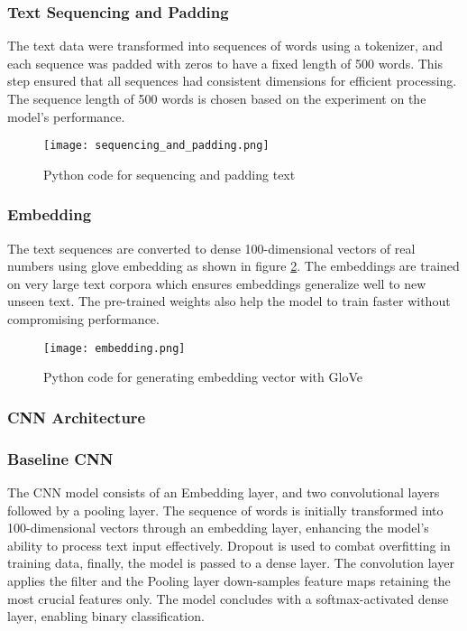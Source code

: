 \subsubsection{Text Sequencing and Padding} The text data were transformed into sequences of words using a tokenizer, and each sequence was padded with zeros to have a fixed length of 500 words. This step ensured that all sequences had consistent dimensions for efficient processing. The sequence length of 500 words is chosen based on the experiment on the model's performance.

\begin{figure}[h]
    \centering
    \texttt{[image: sequencing\_and\_padding.png]}
    \caption{Python code for sequencing and padding text}
    \label{fig:sequencing_and_padding}
\end{figure}

\subsubsection{Embedding} The text sequences are converted to dense 100-dimensional vectors of real numbers using \ac{glove} embedding as shown in figure \ref{fig:embedding_with_glove}. The embeddings are trained on very large text corpora which ensures embeddings generalize well to new unseen text. The pre-trained weights also help the model to train faster without compromising performance.

\begin{figure}[h]
    \centering
    \texttt{[image: embedding.png]}
    \caption{Python code for generating embedding vector with GloVe}
    \label{fig:embedding_with_glove}
\end{figure}

\clearpage
\subsubsection{CNN Architecture}
\subsubsection{Baseline CNN}
The CNN model consists of an Embedding layer, and two convolutional layers followed by a pooling layer. The sequence of words is initially transformed into 100-dimensional vectors through an embedding layer, enhancing the model’s ability to process text input effectively. Dropout is used to combat overfitting in training data, finally, the model is passed to a dense layer. The convolution layer applies the filter and the Pooling layer down-samples feature maps retaining the most crucial features only. The model concludes with a softmax-activated dense layer, enabling binary classification.

